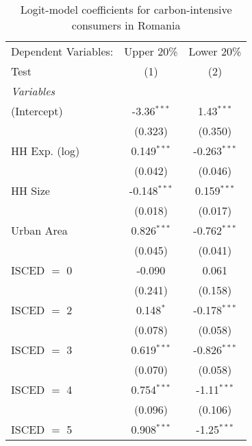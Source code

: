 
\begin{table}[htbp!]
   \centering
   \small
   \begin{adjustbox}{width = 1\textwidth, max height = 0.95\textheight, center}
      \begin{threeparttable}[b]
         \caption{\label{tab:Logit_1_ROU} Logit-model coefficients for carbon-intensive consumers in Romania}
         \begin{tabular}{lcc}
            \tabularnewline \midrule \midrule
            Dependent Variables: & Upper 20\%     & Lower 20\%\\   
            Test                 & (1)            & (2)\\  
            \midrule
            \emph{Variables}\\
            (Intercept)          & -3.36$^{***}$  & 1.43$^{***}$\\   
                                 & (0.323)        & (0.350)\\   
            HH Exp. (log)        & 0.149$^{***}$  & -0.263$^{***}$\\   
                                 & (0.042)        & (0.046)\\   
            HH Size              & -0.148$^{***}$ & 0.159$^{***}$\\   
                                 & (0.018)        & (0.017)\\   
            Urban Area           & 0.826$^{***}$  & -0.762$^{***}$\\   
                                 & (0.045)        & (0.041)\\   
            ISCED $=$ 0          & -0.090         & 0.061\\   
                                 & (0.241)        & (0.158)\\   
            ISCED $=$ 2          & 0.148$^{*}$    & -0.178$^{***}$\\   
                                 & (0.078)        & (0.058)\\   
            ISCED $=$ 3          & 0.619$^{***}$  & -0.826$^{***}$\\   
                                 & (0.070)        & (0.058)\\   
            ISCED $=$ 4          & 0.754$^{***}$  & -1.11$^{***}$\\   
                                 & (0.096)        & (0.106)\\   
            ISCED $=$ 5          & 0.908$^{***}$  & -1.25$^{***}$\\   

\end{tabular}
\end{threeparttable}
\end{adjustbox}
\end{table}
